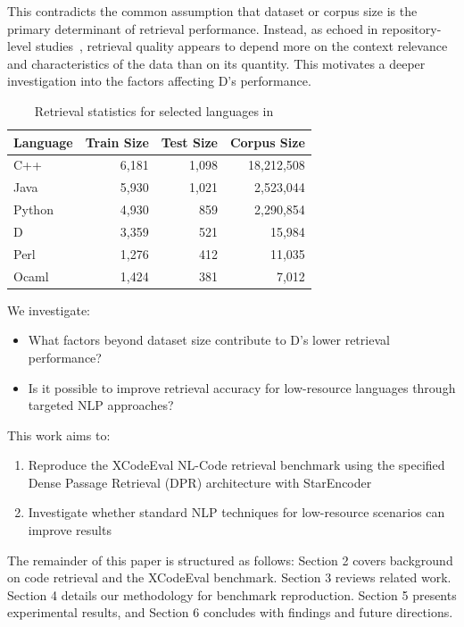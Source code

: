 \documentclass[12pt]{article}
\begin{document}
This contradicts the common assumption that dataset or corpus size is the primary determinant of retrieval performance. Instead, as echoed in repository-level studies~\cite{Zhang2023}, retrieval quality appears to depend more on the context relevance and characteristics of the data than on its quantity. This motivates a deeper investigation into the factors affecting D's performance.

\begin{table}[ht]
\centering
\caption{Retrieval statistics for selected languages in ~\cite{Khan2023}}
\label{tab:xcodeeval-selected}
\begin{tabular}{lrrr}
\hline
\textbf{Language} & \textbf{Train Size} & \textbf{Test Size} & \textbf{Corpus Size} \\
\hline
C++     & 6,181  & 1,098   & 18,212,508 \\
Java    & 5,930  & 1,021   & 2,523,044 \\
Python  & 4,930  & 859     & 2,290,854 \\
D       & 3,359  & 521     & 15,984 \\
Perl    & 1,276  & 412     & 11,035 \\
Ocaml   & 1,424  & 381     & 7,012 \\
\hline
\end{tabular}
\end{table}

We investigate:
\begin{itemize}
    \item What factors beyond dataset size contribute to D's lower retrieval performance?
    \item Is it possible to improve retrieval accuracy for low-resource languages through targeted NLP approaches?
\end{itemize}

This work aims to:
\begin{enumerate}
    \item Reproduce the XCodeEval NL-Code retrieval benchmark using the specified Dense Passage Retrieval (DPR) architecture with StarEncoder \cite{Li2023}
    \item Investigate whether standard NLP techniques for low-resource scenarios can improve results
\end{enumerate}

The remainder of this paper is structured as follows:
Section 2 covers background on code retrieval and the XCodeEval benchmark.
Section 3 reviews related work.
Section 4 details our methodology for benchmark reproduction.
Section 5 presents experimental results, and
Section 6 concludes with findings and future directions.
\end{document}
